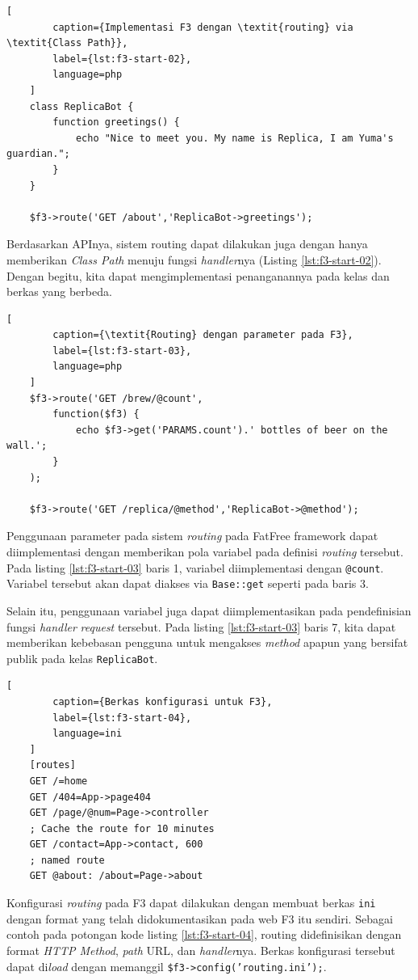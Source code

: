     \begin{lstlisting}[
        caption={Implementasi F3 dengan \textit{routing} via \textit{Class Path}},
        label={lst:f3-start-02},
        language=php
    ]
    class ReplicaBot {
        function greetings() {
            echo "Nice to meet you. My name is Replica, I am Yuma's guardian.";
        }
    }
    
    $f3->route('GET /about','ReplicaBot->greetings');
    \end{lstlisting}

    Berdasarkan APInya, sistem routing dapat dilakukan juga dengan hanya
    memberikan \textit{Class Path} menuju fungsi \textit{handler}nya (Listing
    \ref{lst:f3-start-02}). Dengan begitu, kita dapat mengimplementasi
    penanganannya pada kelas dan berkas yang berbeda.
    
    \begin{lstlisting}[
        caption={\textit{Routing} dengan parameter pada F3},
        label={lst:f3-start-03},
        language=php
    ]
    $f3->route('GET /brew/@count',
        function($f3) {
            echo $f3->get('PARAMS.count').' bottles of beer on the wall.';
        }
    );
    
    $f3->route('GET /replica/@method','ReplicaBot->@method');
    \end{lstlisting}
    Penggunaan parameter pada sistem \textit{routing} pada FatFree framework
    dapat diimplementasi dengan memberikan pola variabel pada definisi
    \textit{routing} tersebut. Pada listing \ref{lst:f3-start-03} baris 1,
    variabel diimplementasi dengan
    \texttt{@count}. Variabel tersebut akan dapat diakses via \texttt{Base::get}
    seperti pada baris 3.
    
    Selain itu, penggunaan variabel juga dapat diimplementasikan pada
    pendefinisian fungsi \textit{handler} \textit{request} tersebut. Pada
    listing \ref{lst:f3-start-03} baris 7, kita dapat memberikan kebebasan
    pengguna untuk mengakses \textit{method} apapun yang bersifat publik pada
    kelas \texttt{ReplicaBot}.
    \begin{lstlisting}[
        caption={Berkas konfigurasi untuk F3},
        label={lst:f3-start-04},
        language=ini
    ]
    [routes]
    GET /=home
    GET /404=App->page404
    GET /page/@num=Page->controller
    ; Cache the route for 10 minutes
    GET /contact=App->contact, 600
    ; named route
    GET @about: /about=Page->about
    \end{lstlisting}
    Konfigurasi \textit{routing} pada F3 dapat dilakukan dengan membuat berkas
    \texttt{ini} dengan format yang telah didokumentasikan pada web F3 itu
    sendiri. Sebagai contoh pada potongan kode listing \ref{lst:f3-start-04},
    routing didefinisikan dengan format \textit{HTTP Method}, \textit{path} URL,
    dan \textit{handler}nya. Berkas konfigurasi tersebut dapat di\textit{load}
    dengan memanggil \texttt{\$f3->config('routing.ini');}.
     
